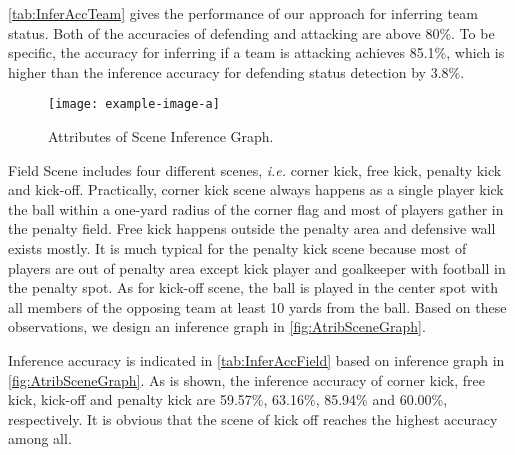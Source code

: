 \autoref{tab:InferAccTeam} gives the performance of our approach for inferring team status. Both of the accuracies of defending and attacking are above 80\%. To be specific, the accuracy for inferring if a team is attacking achieves 85.1\%, which is higher than the inference accuracy for defending status detection by 3.8\%.



\begin{figure}[!bth]
	\centering	
	\begin{minipage}[b]{\linewidth}
		\centerline{\texttt{[image: example-image-a]}}
	\end{minipage}\hfill
	\caption{Attributes of Scene Inference Graph.}
	\label{fig:AtribSceneGraph}
\end{figure}

Field Scene includes four different scenes, \textit{i.e.} corner kick, free kick, penalty kick and kick-off. Practically, corner kick scene always happens as a single player kick the ball within a one-yard radius of the corner flag and most of players gather in the penalty field. Free kick happens outside the penalty area and defensive wall exists mostly. It is much typical for the penalty kick scene because most of players are out of penalty area except kick player and goalkeeper with football in the penalty spot. As for kick-off scene, the ball is played in the center spot with all members of the opposing team at least 10 yards from the ball. Based on these observations, we design an inference graph in \autoref{fig:AtribSceneGraph}.


Inference accuracy is indicated in \autoref{tab:InferAccField} based on inference graph in \autoref{fig:AtribSceneGraph}. As is shown, the inference accuracy of corner kick, free kick, kick-off and penalty kick are 59.57\%, 63.16\%, 85.94\% and 60.00\%, respectively. It is obvious that the scene of kick off reaches the highest accuracy among all.
 

